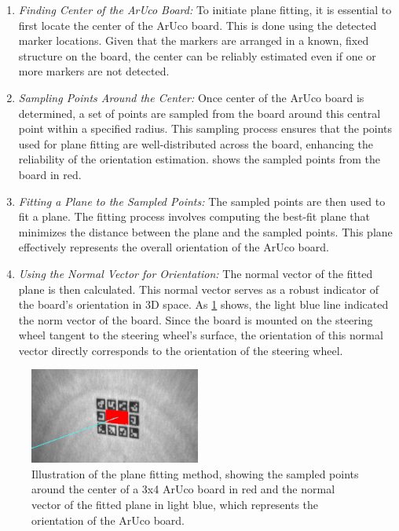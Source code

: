 \begin{enumerate}
    \item \emph{Finding Center of the ArUco Board: }
    To initiate plane fitting, it is essential to first locate 
    the center of the ArUco board. This is done using the 
    detected marker locations. Given that the markers are 
    arranged in a known, fixed structure on the board, 
    the center can be reliably estimated even if one or more 
    markers are not detected.
    \item \emph{Sampling Points Around the Center: }
    Once center of the ArUco board is determined, 
    a set of points are sampled from the board around this 
    central point within a specified radius. This sampling 
    process ensures that the points used for plane fitting are 
    well-distributed across the board, enhancing the reliability 
    of the orientation estimation.  shows 
    the sampled points from the board in red.
    \item \emph{Fitting a Plane to the Sampled Points: }
    The sampled points are then used to fit a plane. 
    The fitting process involves computing the best-fit plane 
    that minimizes the distance between the plane and the 
    sampled points. This plane effectively represents the 
    overall orientation of the ArUco board.
    \item \emph{Using the Normal Vector for Orientation: }
    The normal vector of the fitted plane is then calculated. 
    This normal vector serves as a robust indicator of 
    the board’s orientation in 3D space. As \cref{fig:plane_fitting}
    shows, the light blue line indicated the norm vector of the board.
    Since the board is mounted on the steering wheel tangent to the 
    steering wheel's surface, the orientation of this normal vector 
    directly corresponds to the orientation of the steering wheel.
\end{enumerate}

\begin{figure}[htpb]
    \centering
    \includegraphics[width=0.5\textwidth]{media/chapter 5/plane_fitting.png}
    \caption{Illustration of the plane fitting method, showing the 
    sampled points around the center of a 3x4 ArUco board in red and the 
    normal vector of the fitted plane in light blue, which represents 
    the orientation of the ArUco board.}
    \label{fig:plane_fitting}
\end{figure}

